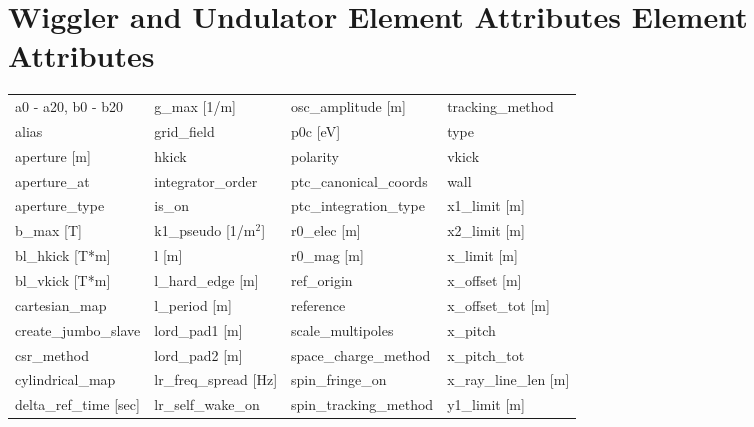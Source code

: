  \section{Wiggler and Undulator Element Attributes Element Attributes}
 \label{s:list.wiggler}
 
 \begin{tabular}{llll} \toprule
a0 - a20, b0 - b20             & g_max [1/m]                    & osc_amplitude [m]              & tracking_method                \\
alias                          & grid_field                     & p0c [eV]                       & type                           \\
aperture [m]                   & hkick                          & polarity                       & vkick                          \\
aperture_at                    & integrator_order               & ptc_canonical_coords           & wall                           \\
aperture_type                  & is_on                          & ptc_integration_type           & x1_limit [m]                   \\
b_max [T]                      & k1_pseudo [1/m$^2$]            & r0_elec [m]                    & x2_limit [m]                   \\
bl_hkick [T*m]                 & l [m]                          & r0_mag [m]                     & x_limit [m]                    \\
bl_vkick [T*m]                 & l_hard_edge [m]                & ref_origin                     & x_offset [m]                   \\
cartesian_map                  & l_period [m]                   & reference                      & x_offset_tot [m]               \\
create_jumbo_slave             & lord_pad1 [m]                  & scale_multipoles               & x_pitch                        \\
csr_method                     & lord_pad2 [m]                  & space_charge_method            & x_pitch_tot                    \\
cylindrical_map                & lr_freq_spread [Hz]            & spin_fringe_on                 & x_ray_line_len [m]             \\
delta_ref_time [sec]           & lr_self_wake_on                & spin_tracking_method           & y1_limit [m]                   \\

\end{tabular}
